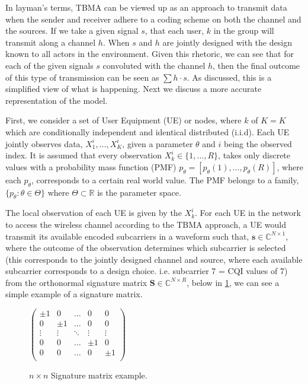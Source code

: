 \documentclass{article}
\begin{document}
In layman's terms, TBMA can be viewed up as an approach to transmit data when the sender and receiver adhere to a coding scheme on both the channel and the sources. If we take a given signal $s$, that each user, $k$ in the group will transmit along a channel $h$. When $s$ and $h$ are jointly designed with the design known to all actors in the environment. Given this rhetoric, we can see that for each of the given signals $s$ convoluted with the channel $h$, then the final outcome of this type of transmission can be seen as $\sum h \cdot s$. As discussed, this is a simplified view of what is happening. Next we discuss a more accurate representation of the model. 


First, we  consider a set of User Equipment (UE) or nodes, where ${k}$ of ${K} = K$ which are conditionally independent and identical distributed (i.i.d). Each UE jointly observes data, $X^i_1, \ldots, X^i_K$, given a parameter $\theta$ and $i$ being the observed index. It is assumed that every observation  ${X^i_k \in \{1, \ldots, R\}}$, takes only discrete values with a probability mass function (PMF) ${p_{\theta} = [p_{\theta}(1), \ldots, p_{\theta}(R)]}$, where each $p_{\theta}$, corresponds to a certain real world value. The PMF belongs to a family, $\{p_{\theta}: \theta \in \Theta\}$ where $\Theta \subset \mathbb{R}$ is the parameter space.



The local observation of each UE is given by the $X^i_k$. For each UE in the network to access the wireless channel according to the TBMA approach, a UE would transmit its available encoded subcarriers in a waveform such that, $\boldsymbol{s} \in \mathbb{C}^{N \times 1}$, where the outcome of the observation determines which subcarrier is selected (this corresponds to the jointly designed channel and source, where each available subcarrier corresponds to a design choice. i.e. subcarrier 7 =  CQI values of 7) from the orthonormal signature matrix $\boldsymbol{S} \in \mathbb{C}^{N \times R}$, below in \cref{fig:sig_mat}, we can see a simple example of a signature matrix.

\begin{figure}[ht]
\centering
    $\begin{pmatrix}
\pm1 & 0 & \hdots & 0 & 0\\
0 & \pm1 & \hdots & 0 & 0 \\
\vdots & \vdots & \ddots & \vdots & \vdots \\
0 & 0 & \hdots & \pm1 & 0 \\
0 & 0 & \hdots & 0 & \pm1 \\
\end{pmatrix}$
\caption{$n \times n$ Signature matrix example.}
\label{fig:sig_mat}
\end{figure}
\end{document}
